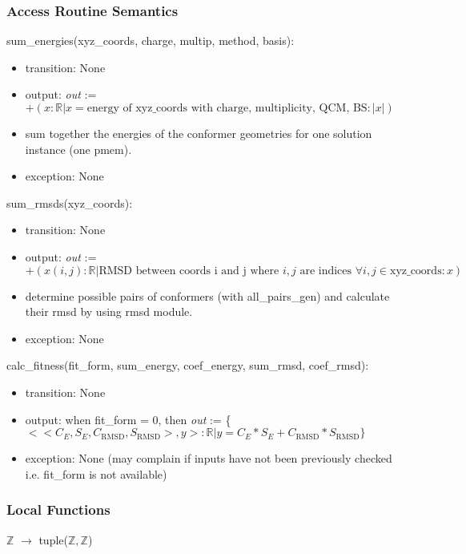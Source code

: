 \documentclass[12pt, titlepage]{article}
\begin{document}
\subsubsection{Access Routine Semantics}

\noindent sum\_energies(xyz\_coords, charge, multip, method, basis):
\begin{itemize}
	\item transition: None
	\item output: \textit{out} := $+(x: \mathbb{R}|x = \text{energy of 
		xyz\_coords with charge, multiplicity, QCM, BS}: |x|)$
	\item sum together the energies of the conformer geometries for one 
	solution 
	instance (one pmem).
	\item exception: None
\end{itemize}

\noindent sum\_rmsds(xyz\_coords):
\begin{itemize}
	\item transition: None
	\item output: \textit{out} := $+(x(i,j): \mathbb{R}| \text{RMSD between 
		coords i and j where } i,j \text{ are indices } \forall i,j \in 
	\text{xyz\_coords}: x)$
	\item determine possible pairs of conformers (with all\_pairs\_gen) and 
	calculate 
	their rmsd by using rmsd module.
	\item exception: None
\end{itemize}

\noindent calc\_fitness(fit\_form, sum\_energy, coef\_energy, sum\_rmsd, 
coef\_rmsd):
\begin{itemize}
	\item transition: None
	\item output: when fit\_form = 0, then \textit{out} := \{
	$<<C_E,S_E,C_{\text{RMSD}},S_{\text{RMSD}}>,y> : \mathbb{R} | y = 
	C_E*S_E+C_{\text{RMSD}}*S_{\text{RMSD}} \}$
	\item exception: None (may complain if inputs have not been previously 
	checked i.e. fit\_form is not available)
\end{itemize}

\subsubsection{Local Functions}

$\mathbb{Z}$ $\rightarrow$ tuple($\mathbb{Z}, \mathbb{Z}$)
\end{document}
